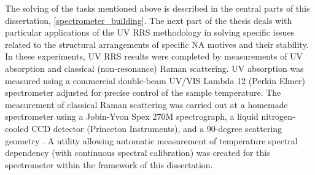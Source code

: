 The solving of the tasks mentioned above is described in the central parts of
this dissertation,
\cref{spectrometer_building}.
The next part of the thesis deals with particular applications of the UV RRS
methodology in solving specific issues related to the structural arrangements
of specific NA motives and their stability.
In these experiments, UV RRS results were completed by measurements of UV
absorption and classical (non-resonance) Raman scattering.
UV absorption was measured using a commercial double-beam UV/VIS
Lambda 12 (Perkin Elmer) spectrometer adjusted for precise control of the
sample temperature.
The measurement of classical Raman scattering was carried out at a homemade
spectrometer using a Jobin-Yvon Spex 270M spectrograph, a liquid
nitrogen‐cooled CCD detector (Princeton Instruments), and a 90-degree
scattering geometry
\parencite{Palacky2011}.
A utility allowing automatic measurement of temperature spectral dependency
(with continuous spectral calibration) was created for this spectrometer within
the framework of this dissertation.
